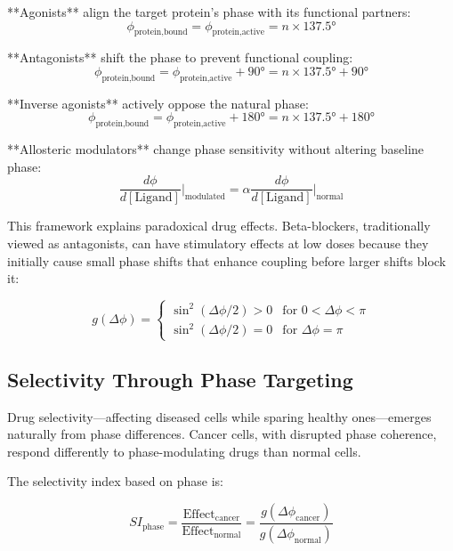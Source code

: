 \documentclass[12pt,a4paper]{report}
\begin{document}
**Agonists** align the target protein's phase with its functional partners:
\begin{equation}
\phi_{\text{protein,bound}} = \phi_{\text{protein,active}} = n \times 137.5°
\end{equation}

**Antagonists** shift the phase to prevent functional coupling:
\begin{equation}
\phi_{\text{protein,bound}} = \phi_{\text{protein,active}} + 90° = n \times 137.5° + 90°
\end{equation}

**Inverse agonists** actively oppose the natural phase:
\begin{equation}
\phi_{\text{protein,bound}} = \phi_{\text{protein,active}} + 180° = n \times 137.5° + 180°
\end{equation}

**Allosteric modulators** change phase sensitivity without altering baseline phase:
\begin{equation}
\frac{d\phi}{d[\text{Ligand}]}\bigg|_{\text{modulated}} = \alpha \frac{d\phi}{d[\text{Ligand}]}\bigg|_{\text{normal}}
\end{equation}

This framework explains paradoxical drug effects. Beta-blockers, traditionally viewed as antagonists, can have stimulatory effects at low doses because they initially cause small phase shifts that enhance coupling before larger shifts block it:

\begin{equation}
g(\Delta\phi) = \begin{cases}
\sin^2(\Delta\phi/2) > 0 & \text{for } 0 < \Delta\phi < \pi \\
\sin^2(\Delta\phi/2) = 0 & \text{for } \Delta\phi = \pi
\end{cases}
\end{equation}

\subsection{Selectivity Through Phase Targeting}

Drug selectivity—affecting diseased cells while sparing healthy ones—emerges naturally from phase differences. Cancer cells, with disrupted phase coherence, respond differently to phase-modulating drugs than normal cells.

The selectivity index based on phase is:

\begin{equation}
SI_{\text{phase}} = \frac{\text{Effect}_{\text{cancer}}}{\text{Effect}_{\text{normal}}} = \frac{g(\Delta\phi_{\text{cancer}})}{g(\Delta\phi_{\text{normal}})}
\end{equation}
\end{document}
